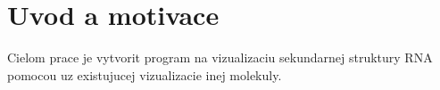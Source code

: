 
\chapter{Uvod a motivace}

Cielom prace je vytvorit program na vizualizaciu sekundarnej struktury RNA
pomocou uz existujucej vizualizacie inej molekuly.




